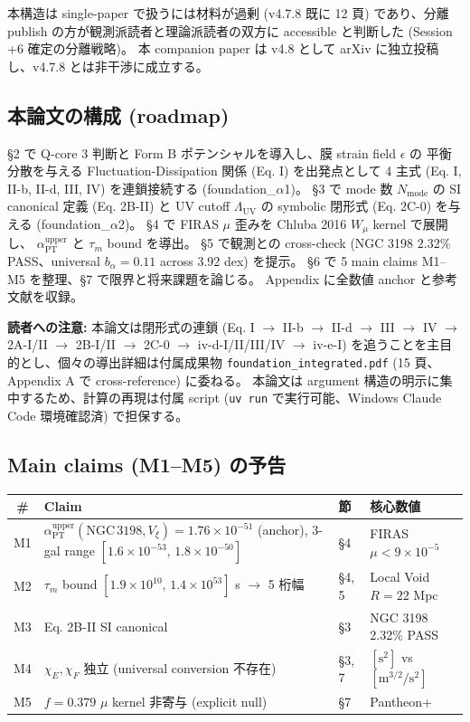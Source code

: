\documentclass[11pt,a4paper]{ltjsarticle}
\newcommand{\Vxi}{V_{\xi}}
\newcommand{\Nmode}{N_{\mathrm{mode}}}
\newcommand{\aPT}{\alpha_{\mathrm{PT}}}
\newcommand{\taum}{\tau_{m}}
\newcommand{\bal}{b_{\alpha}}
\newcommand{\Wmu}{W_{\mu}}
\newcommand{\Lambdauv}{\Lambda_{\mathrm{UV}}}
\begin{document}
本構造は single-paper で扱うには材料が過剰 (v4.7.8 既に 12 頁) であり、分離 publish
の方が観測派読者と理論派読者の双方に accessible と判断した (Session +6 確定の分離戦略)。
本 companion paper は v4.8 として arXiv に独立投稿し、v4.7.8 とは非干渉に成立する。

\subsection{本論文の構成 (roadmap)}
\S 2 で Q-core 3 判断と Form B ポテンシャルを導入し、膜 strain field $\epsilon$ の
平衡分散を与える Fluctuation-Dissipation 関係 (Eq. I) を出発点として
4 主式 (Eq. I, II-b, II-d, III, IV) を連鎖接続する (foundation\_$\alpha$1)。
\S 3 で mode 数 $\Nmode$ の SI canonical 定義 (Eq. 2B-II) と UV cutoff $\Lambdauv$ の symbolic
閉形式 (Eq. 2C-0) を与える (foundation\_$\alpha$2)。
\S 4 で FIRAS $\mu$ 歪みを Chluba 2016 $\Wmu$ kernel で展開し、
$\aPT^{\mathrm{upper}}$ と $\taum$ bound を導出。
\S 5 で観測との cross-check (NGC 3198 2.32\% PASS、universal $\bal = 0.11$ across 3.92 dex) を提示。
\S 6 で 5 main claims M1--M5 を整理、\S 7 で限界と将来課題を論じる。
Appendix に全数値 anchor と参考文献を収録。

\begin{notebox}
\textbf{読者への注意:}
本論文は閉形式の連鎖
(Eq. I $\to$ II-b $\to$ II-d $\to$ III $\to$ IV $\to$ 2A-I/II $\to$ 2B-I/II $\to$ 2C-0 $\to$
iv-d-I/II/III/IV $\to$ iv-e-I)
を追うことを主目的とし、個々の導出詳細は付属成果物
\texttt{foundation\_integrated.pdf} (15 頁、Appendix A で cross-reference) に委ねる。
本論文は argument 構造の明示に集中するため、計算の再現は付属 script
(\texttt{uv run} で実行可能、Windows Claude Code 環境確認済) で担保する。
\end{notebox}

\subsection{Main claims (M1--M5) の予告}
\begin{center}\small
\begin{tabular}{@{}c>{\raggedright\arraybackslash}p{75mm}l>{\raggedright\arraybackslash}p{45mm}@{}}
\toprule
\# & Claim & 節 & 核心数値 \\
\midrule
M1 & $\aPT^{\mathrm{upper}}(\mathrm{NGC\,3198},\Vxi) = 1.76 \times 10^{-51}$ (anchor), 3-gal range $[1.6\times10^{-53},\,1.8\times10^{-50}]$ & \S 4 & FIRAS $\mu < 9 \times 10^{-5}$ \\
M2 & $\taum$ bound $[1.9 \times 10^{10},\, 1.4 \times 10^{53}]$ s $\to$ 5 桁幅 & \S 4, 5 & Local Void $R=22$ Mpc \\
M3 & Eq. 2B-II SI canonical & \S 3 & NGC 3198 2.32\% PASS \\
M4 & $\chi_E,\chi_F$ 独立 (universal conversion 不存在) & \S 3, 7 & $[\mathrm{s}^2]$ vs $[\mathrm{m}^{3/2}/\mathrm{s}^2]$ \\
M5 & $f=0.379$ $\mu$ kernel 非寄与 (explicit null) & \S 7 & Pantheon+ \citep{Scolnic2022} \\
\bottomrule
\end{tabular}
\end{center}
\end{document}
